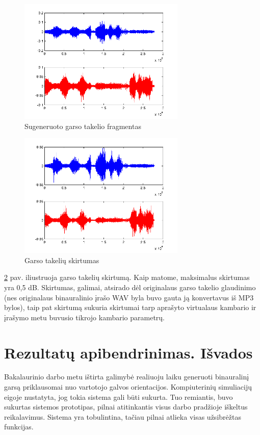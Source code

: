 \documentclass[]{vgtuef}
\begin{document}
{\begin{figure}[ht]
  \centering
  \includegraphics[width=300px]{img/garsas_generuotas.png}
  \caption{Sugeneruoto garso takelio fragmentas}
  \label{fig:garsas_gen}
\end{figure}

\begin{figure}[ht]
  \centering
  \includegraphics[width=300px]{img/garso_skirtumas.png}
  \caption{Garso takelių skirtumas}
  \label{fig:garsas_diff}
\end{figure}

\ref{fig:garsas_diff} pav. iliustruoja garso takelių skirtumą. Kaip matome, maksimalus skirtumas yra 0,5 dB. Skirtumas, galimai, atsirado dėl originalaus garso takelio glaudinimo (nes originalaus binauralinio įrašo WAV byla buvo gauta ją konvertavus iš MP3 bylos), taip pat skirtumą sukuria skirtumai tarp aprašyto virtualaus kambario ir įrašymo metu buvusio tikrojo kambario parametrų. 


\section{Rezultatų apibendrinimas. Išvados}

Bakalaurinio darbo metu ištirta galimybė realiuoju laiku generuoti binauralinį garsą priklausomai nuo vartotojo galvos orientacijos. Kompiuterinių simuliacijų eigoje nustatyta, jog tokia sistema gali būti sukurta. Tuo remiantis, buvo sukurtas sistemos prototipas, pilnai atitinkantis visus darbo pradžioje iškeltus reikalavimus. Sistema yra tobulintina, tačiau pilnai atlieka visas užsibrėžtas funkcijas.

}
\end{document}
